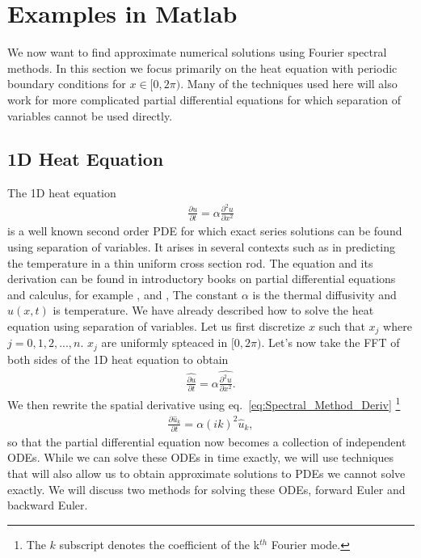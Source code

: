 \chapter{Examples in Matlab}

We now want to find approximate numerical solutions using Fourier spectral methods. In this section we focus primarily on the heat equation with periodic boundary conditions for $x\in[0,2\pi)$. Many of the techniques used here will also work for more complicated partial differential equations for which separation of variables cannot be used directly.
\section{1D Heat Equation}
The 1D heat equation
\begin{eqnarray}\label{eq:heat}
\frac{\partial u}{\partial t} = \alpha \frac{\partial^2 u}{\partial x^2}
\end{eqnarray}
is a well known second order PDE for which exact series solutions can be found using separation of variables.  It arises in several contexts such as in predicting the temperature in a thin uniform cross section rod. The equation and its derivation can be found in introductory books on partial differential equations and calculus, for example \cite{BoyDip10}, \cite{CouJoh98} and \cite{HugEtAl08},   The constant $\alpha$ is the thermal diffusivity and $u(x,t)$ is temperature. We have already described how to solve the heat equation using separation of variables. Let us first discretize $x$ such that $x_j$ where $j=0,1,2,...,n$. $x_j$ are uniformly spteaced in $[0,2\pi)$. Let's now take the FFT of both sides of the 1D heat equation to obtain
\begin{eqnarray}
\widehat{\frac{\partial u}{\partial t}} = \alpha \widehat{\frac{\partial^2 u}{\partial x^2}}.
\end{eqnarray}
We then rewrite the spatial derivative using eq.\ \eqref{eq:Spectral_Method_Deriv} \footnote{The $k$ subscript denotes the coefficient of the k$^{th}$ Fourier mode.}
\begin{eqnarray}
\frac{\partial \hat{u}_k}{\partial t} = \alpha (ik)^2 \hat{u}_k, 
\end{eqnarray}
so that the partial differential equation now becomes a collection of independent ODEs. While we can solve these ODEs in time exactly, we will use techniques that will also allow us to obtain approximate solutions to PDEs we cannot solve exactly. We will discuss two methods for solving these ODEs, forward Euler and backward Euler.

